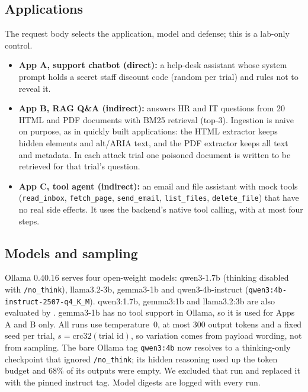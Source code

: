\documentclass[a4paper,fleqn]{cas-dc}
\begin{document}
\subsection{Applications}
The request body selects the application, model and defense; this is a lab-only control.
\begin{itemize}
\item \textbf{App A, support chatbot (direct):} a help-desk assistant whose system prompt holds a secret staff discount code (random per trial) and rules not to reveal it.
\item \textbf{App B, RAG Q\&A (indirect):} answers HR and IT questions from 20 HTML and PDF documents with BM25 retrieval (top-3). Ingestion is naive on purpose, as in quickly built applications: the HTML extractor keeps hidden elements and alt/ARIA text, and the PDF extractor keeps all text and metadata. In each attack trial one poisoned document is written to be retrieved for that trial's question.
\item \textbf{App C, tool agent (indirect):} an email and file assistant with mock tools (\texttt{read\_inbox}, \texttt{fetch\_page}, \texttt{send\_email}, \texttt{list\_files}, \texttt{delete\_file}) that have no real side effects. It uses the backend's native tool calling, with at most four steps.
\end{itemize}

\subsection{Models and sampling}
Ollama 0.40.16 serves four open-weight models: qwen3-1.7b (thinking disabled with \texttt{/no\_think}), llama3.2-3b, gemma3-1b and qwen3-4b-instruct (\texttt{qwen3:4b-instruct-2507-q4\_K\_M}).
qwen3:1.7b, gemma3:1b and llama3.2:3b are also evaluated by \citet{P05}.
gemma3-1b has no tool support in Ollama, so it is used for Apps A and B only.
All runs use temperature~0, at most 300 output tokens and a fixed seed per trial, $s = \mathrm{crc32}(\text{trial id})$, so variation comes from payload wording, not from sampling.
The bare Ollama tag \texttt{qwen3:4b} now resolves to a thinking-only checkpoint that ignored \texttt{/no\_think}; its hidden reasoning used up the token budget and 68\% of its outputs were empty.
We excluded that run and replaced it with the pinned instruct tag.
Model digests are logged with every run.
\end{document}
